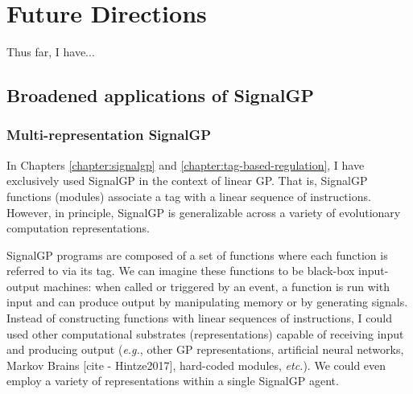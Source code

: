 \section{Future Directions}


Thus far, I have...

\subsection{Broadened applications of SignalGP}




\subsubsection{Multi-representation SignalGP}

In Chapters \ref{chapter:signalgp} and \ref{chapter:tag-based-regulation}, I have exclusively used SignalGP in the context of linear GP.
That is, SignalGP functions (modules) associate a tag with a linear sequence of instructions. 
However, in principle, SignalGP is generalizable across a variety of evolutionary computation representations. 

SignalGP programs are composed of a set of functions where each function is referred to via its tag. 
We can imagine these functions to be black-box input-output machines: when called or triggered by an event, a function is run with input and can produce output by manipulating memory or by generating signals. 
Instead of constructing functions with linear sequences of instructions, I could used other computational substrates (representations) capable of receiving input and producing output (\textit{e.g.}, other GP representations, artificial neural networks, Markov Brains [cite - Hintze2017], hard-coded modules, \textit{etc.}). 
We could even employ a variety of representations within a single SignalGP agent. 

